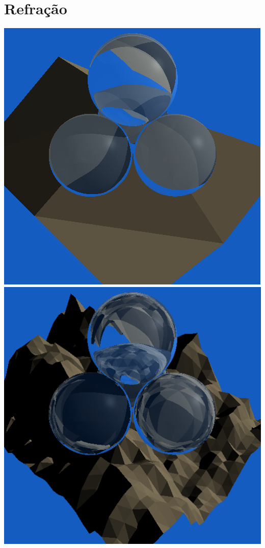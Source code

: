 \documentclass{article}
\begin{document}
    \section*{Refração}
        \begin{center}
            \includegraphics[scale=0.27]{mount_low}
            \includegraphics[scale=0.27]{mount_med} 

\end{center}
\end{document}

